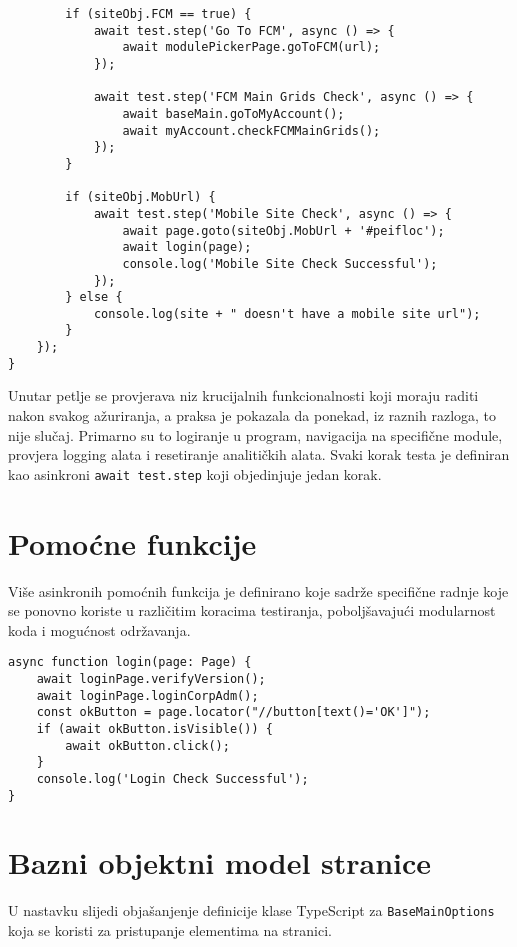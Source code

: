 \begin{verbatim}
        if (siteObj.FCM == true) {
            await test.step('Go To FCM', async () => {
                await modulePickerPage.goToFCM(url);
            });

            await test.step('FCM Main Grids Check', async () => {
                await baseMain.goToMyAccount();
                await myAccount.checkFCMMainGrids();
            });
        }

        if (siteObj.MobUrl) {
            await test.step('Mobile Site Check', async () => {
                await page.goto(siteObj.MobUrl + '#peifloc');
                await login(page);
                console.log('Mobile Site Check Successful');
            });
        } else {
            console.log(site + " doesn't have a mobile site url");
        }
    });
}
\end{verbatim}

Unutar petlje se provjerava niz krucijalnih funkcionalnosti koji moraju raditi nakon svakog ažuriranja, a praksa je pokazala da ponekad, iz raznih razloga, to nije slučaj.
Primarno su to logiranje u program, navigacija na specifične module, provjera logging alata i resetiranje analitičkih alata.
Svaki korak testa je definiran kao asinkroni \texttt{await test.step} koji objedinjuje jedan korak.

\section{Pomoćne funkcije}

Više asinkronih pomoćnih funkcija je definirano koje sadrže specifične radnje koje se ponovno koriste u različitim koracima testiranja, poboljšavajući modularnost koda i mogućnost održavanja.

\begin{verbatim}
async function login(page: Page) {
    await loginPage.verifyVersion();
    await loginPage.loginCorpAdm();
    const okButton = page.locator("//button[text()='OK']");
    if (await okButton.isVisible()) {
        await okButton.click();
    }
    console.log('Login Check Successful');
}
\end{verbatim}

\section{Bazni objektni model stranice}

U nastavku slijedi objašanjenje definicije klase TypeScript za \texttt{BaseMainOptions} koja se koristi za pristupanje elementima na stranici.

